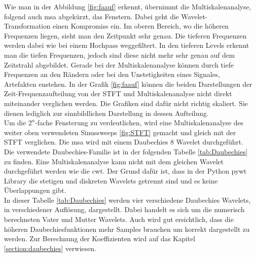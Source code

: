Wie man in der Abbildung \ref{fig:faauf} erkennt, übernimmt die Multiskalenanalyse, folgend auch msa abgekürzt, das Fenstern. Dabei geht die Wavelet-Transformation einen Kompromiss ein. Im oberen Bereich, wo die höheren Frequenzen liegen, sieht man den Zeitpunkt sehr genau. Die tieferen Frequenzen werden dabei wie bei einem Hochpass weggefiltert. In den tieferen Levels erkennt man die tiefen Frequenzen, jedoch sind diese nicht mehr sehr genau auf dem Zeitstrahl abgebildet. Gerade bei der Multiskalenanalyse können durch tiefe Frequenzen an den Rändern oder bei den Unstetigkeiten eines Signales, Artefakten enstehen. In der Grafik \ref{fig:faauf} können die beiden Darstellungen der Zeit-Frequenzaufteilung von der STFT und Multiskalenanalyse nicht direkt miteinander verglichen werden. Die Grafiken sind dafür nicht richtig skaliert. Sie dienen lediglich zur sinnbildlichen Darstellung in dessen Aufteilung.\\

Um die $2^{n}$-fache Fensterung zu verdeutlichen, wird eine  Multiskalenanalyse des weiter oben verwendeten Sinussweeps \ref{fig:STFT} gemacht und gleich mit der STFT verglichen.
Die msa wird mit einem Daubechies 8 Wavelet durchgeführt. Die verwendete Daubechies-Familie ist in der folgenden Tabelle \ref{tab:Daubechies} zu finden. Eine Multiskalenanalyse kann nicht mit dem gleichen Wavelet durchgeführt werden wie die cwt. Der Grund dafür ist, dass in der Python pywt Library die stetigen und diskreten Wavelets getrennt sind und es keine Überlappungen gibt. \\
In dieser Tabelle \ref{tab:Daubechies} werden vier verschiedene Daubechies Wavelets, in verschiedener Auflösung, dargestellt. Dabei handelt es sich um die numerisch berechneten Vater und Mutter Wavelets. Auch wird gut ersichtlich, dass die höheren Daubechiesfunktionen mehr Samples brauchen um korrekt dargestellt zu werden. Zur Berechnung der Koeffizienten wird auf das Kapitel \ref{section:daubechies} verwiesen.\\


